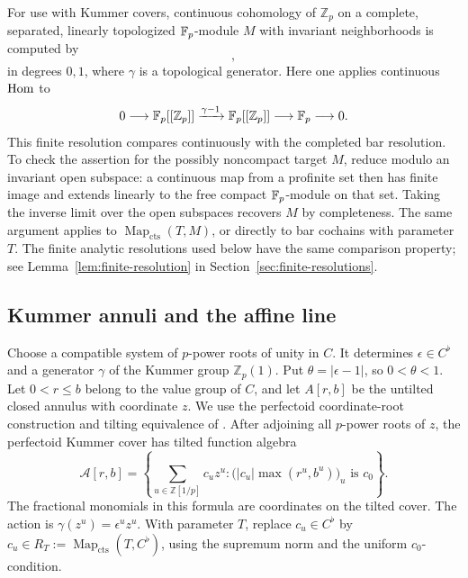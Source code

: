 For use with Kummer covers, continuous cohomology of
\(\mathbb Z_p\) on a complete, separated, linearly topologized
\(\mathbb F_p\)-module \(M\) with invariant neighborhoods is computed by
\begin{equation}
 [\,M\xrightarrow{\gamma-1}M\,],
 \label{eq:analytic-cyclic}
\end{equation}
in degrees \(0,1\), where \(\gamma\) is a topological generator.
Here one applies continuous \(\operatorname{Hom}\) to
\[
 0\longrightarrow\mathbb F_p[[\mathbb Z_p]]
 \xrightarrow{\gamma-1}\mathbb F_p[[\mathbb Z_p]]
 \longrightarrow\mathbb F_p\longrightarrow0.
\]
This finite resolution compares continuously with the completed bar
resolution.  To check the assertion for the possibly noncompact
target \(M\), reduce modulo an invariant open subspace: a continuous
map from a profinite set then has finite image and extends linearly
to the free compact \(\mathbb F_p\)-module on that set.  Taking the inverse
limit over the open subspaces recovers \(M\) by completeness.
The same argument applies to
\(\operatorname{Map}_{\mathrm{cts}}(T,M)\), or directly to bar
cochains with parameter \(T\).  The finite analytic resolutions used
below have the same comparison property; see
Lemma~\ref{lem:finite-resolution} in
Section~\ref{sec:finite-resolutions}.

\subsection{Kummer annuli and the affine line}

Choose a compatible system of \(p\)-power roots of unity in \(C\).
It determines \(\epsilon\in C^\flat\) and a generator \(\gamma\) of
the Kummer group \(\mathbb Z_p(1)\).  Put
\(\theta=|\epsilon-1|\), so \(0<\theta<1\).
Let \(0<r\leq b\) belong to the value group of \(C\), and let
\(A[r,b]\) be the untilted closed annulus with coordinate \(z\).
We use the perfectoid coordinate-root construction and tilting
equivalence of \cite[Propositions~5.20 and~6.17]{Scholze12}.
After adjoining all \(p\)-power roots of \(z\), the perfectoid
Kummer cover has tilted function algebra
\begin{equation}
 \mathcal A[r,b]
 =
 \left\{\sum_{u\in\mathbb Z[1/p]}c_u z^u:
 \bigl(|c_u|\max(r^u,b^u)\bigr)_u\text{ is }c_0\right\}.
 \label{eq:analytic-annulus-algebra}
\end{equation}
The fractional monomials in this formula are coordinates on the
tilted cover.  The action is
\(\gamma(z^u)=\epsilon^u z^u\).
With parameter \(T\), replace \(c_u\in C^\flat\) by
\(c_u\in R_T:=\operatorname{Map}_{\mathrm{cts}}(T,C^\flat)\), using
the supremum norm and the uniform \(c_0\)-condition.

